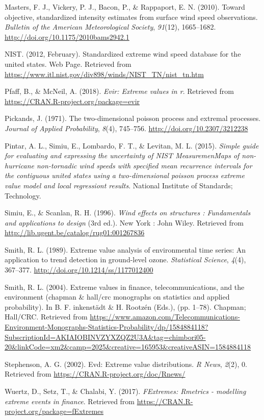 \documentclass[12pt,oneside]{reedthesis}
\begin{document}
\leavevmode\hypertarget{ref-Masters2010}{}%
Masters, F. J., Vickery, P. J., Bacon, P., \& Rappaport, E. N. (2010). Toward objective, standardized intensity estimates from surface wind speed observations. \emph{Bulletin of the American Meteorological Society}, \emph{91}(12), 1665--1682. \url{http://doi.org/10.1175/2010bams2942.1}

\leavevmode\hypertarget{ref-nist2012}{}%
NIST. (2012, February). Standardized extreme wind speed database for the united states. Web Page. Retrieved from \url{https://www.itl.nist.gov/div898/winds/NIST_TN/nist_tn.htm}

\leavevmode\hypertarget{ref-Pfaff2018}{}%
Pfaff, B., \& McNeil, A. (2018). \emph{Evir: Extreme values in r}. Retrieved from \url{https://CRAN.R-project.org/package=evir}

\leavevmode\hypertarget{ref-Pickands1971}{}%
Pickands, J. (1971). The two-dimensional poisson process and extremal processes. \emph{Journal of Applied Probability}, \emph{8}(4), 745--756. \url{http://doi.org/10.2307/3212238}

\leavevmode\hypertarget{ref-Pintar2015}{}%
Pintar, A. L., Simiu, E., Lombardo, F. T., \& Levitan, M. L. (2015). \emph{Simple guide for evaluating and expressing the uncertainty of NIST MeasuremenMaps of non-hurricane non-tornadic wind speeds with specified mean recurrence intervals for the contiguous united states using a two-dimensional poisson process extreme value model and local regressiont results}. National Institute of Standards; Technology.

\leavevmode\hypertarget{ref-Simiu1996}{}%
Simiu, E., \& Scanlan, R. H. (1996). \emph{Wind effects on structures : Fundamentals and applications to design} (3rd ed.). New York : John Wiley. Retrieved from \url{http://lib.ugent.be/catalog/rug01:001267836}

\leavevmode\hypertarget{ref-Smith1989}{}%
Smith, R. L. (1989). Extreme value analysis of environmental time series: An application to trend detection in ground-level ozone. \emph{Statistical Science}, \emph{4}(4), 367--377. \url{http://doi.org/10.1214/ss/1177012400}

\leavevmode\hypertarget{ref-Smith2004}{}%
Smith, R. L. (2004). Extreme values in finance, telecommunications, and the environment (chapman \& hall/crc monographs on statistics and applied probability). In B. F. inkenstädt \& H. Rootzén (Eds.), (pp. 1--78). Chapman; Hall/CRC. Retrieved from \url{https://www.amazon.com/Telecommunications-Environment-Monographs-Statistics-Probability/dp/1584884118?SubscriptionId=AKIAIOBINVZYXZQZ2U3A\&tag=chimbori05-20\&linkCode=xm2\&camp=2025\&creative=165953\&creativeASIN=1584884118}

\leavevmode\hypertarget{ref-Stephenson2002}{}%
Stephenson, A. G. (2002). Evd: Extreme value distributions. \emph{R News}, \emph{2}(2), 0. Retrieved from \url{https://CRAN.R-project.org/doc/Rnews/}

\leavevmode\hypertarget{ref-Wuertz2017}{}%
Wuertz, D., Setz, T., \& Chalabi, Y. (2017). \emph{FExtremes: Rmetrics - modelling extreme events in finance}. Retrieved from \url{https://CRAN.R-project.org/package=fExtremes}


\end{document}

